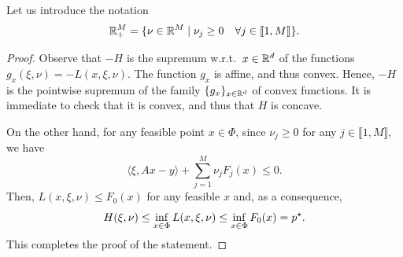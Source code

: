  Let us introduce the notation
 \begin{equation}
     \mathbb{R}^M_+=\{\nu\in \mathbb{R}^M\mid \nu_j\ge 0\quad \forall j\in \llbracket 1,M\rrbracket\}.
 \end{equation}
 
 
 
 \begin{proof}
     Observe that $-H$ is the supremum w.r.t.~$x\in \mathbb{R}^d$ of the functions $g_x(\xi,\nu) = -L(x,\xi,\nu)$. The function $g_x$ is affine, and thus convex. Hence, $-H$ is the pointwise supremum of the family $\{g_x\}_{x\in\mathbb{R}^d}$ of convex functions. It is immediate to check that it is convex, and thus that $H$ is concave.
 
     On the other hand, for any feasible point $x\in \Phi$, since $\nu_j\ge 0$ for any $j\in \llbracket1,M\rrbracket$, we have
     \begin{equation}
         \langle \xi, Ax-y\rangle +\sum_{j=1}^M \nu_j F_j(x) \le 0.
     \end{equation}
     Then, $L(x,\xi,\nu)\le F_0(x)$ for any feasible $x$ and, as a consequence,
     \begin{equation}
         H(\xi,\nu) \le \inf_{x\in\operatorname{\Phi}} L(x,\xi,\nu) \le \inf_{x\in\operatorname{\Phi}}F_0(x) = p^\star.
     \end{equation}
     This completes the proof of the statement.
 \end{proof}
 
